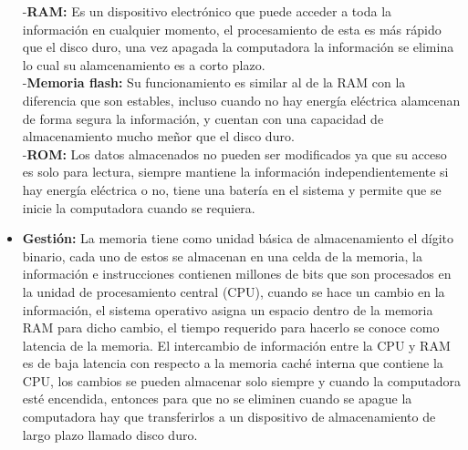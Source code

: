 \documentclass{article}
\begin{document}
\begin{flushleft}
\begin{itemize}
        -\textbf{RAM:} Es un dispositivo electrónico que puede acceder a toda la información en cualquier momento, el procesamiento de esta es más rápido que el disco duro, una vez apagada la computadora la información se elimina lo cual su alamcenamiento es a corto plazo.\\
        -\textbf{Memoria flash:} Su funcionamiento es similar al de la RAM con la diferencia que son estables, incluso cuando no hay energía eléctrica alamcenan de forma segura la información, y cuentan con una capacidad de almacenamiento mucho meñor que el disco duro.\\
        -\textbf{ROM:} Los datos almacenados no pueden ser modificados ya que su acceso es solo para lectura, siempre mantiene la información independientemente si hay energía eléctrica o no, tiene una batería en el sistema y permite que se inicie la computadora cuando se requiera.\\
        \item \textbf{Gestión:} La memoria tiene como unidad básica de almacenamiento el dígito binario, cada uno de estos se almacenan en una celda de la memoria, la información e instrucciones contienen millones de bits que son procesados en la unidad de procesamiento central (CPU), cuando se hace un cambio en la información, el sistema operativo asigna un espacio dentro de la memoria RAM para dicho cambio, el tiempo requerido para hacerlo se conoce como latencia de la memoria. El intercambio de información entre la CPU y RAM es de baja latencia con respecto a la memoria caché interna que contiene la CPU, los cambios se pueden almacenar solo siempre y cuando la computadora esté encendida, entonces para que no se eliminen cuando se apague la computadora hay que transferirlos a un dispositivo de almacenamiento de largo plazo llamado disco duro. 
    \end{itemize}
\end{flushleft}
\end{document}
